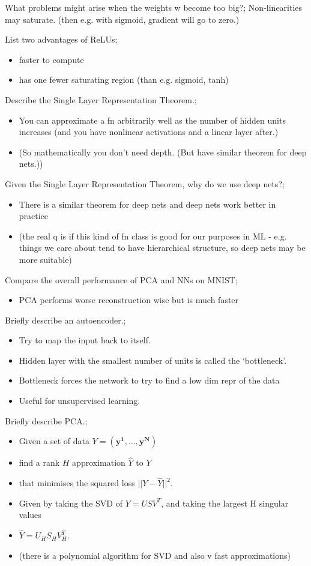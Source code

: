 \documentclass{article}
\begin{document}
What problems might arise when the weights w become too big?; Non-linearities may saturate. (then e.g. with sigmoid, gradient will go to zero.)

List two advantages of ReLUs; \begin{itemize}
    \item faster to compute
    \item has one fewer saturating region (than e.g. sigmoid, tanh)
\end{itemize}

Describe the Single Layer Representation Theorem.; \begin{itemize}
    \item You can approximate a fn arbitrarily well as the number of hidden units increases (and you have nonlinear activations and a linear layer after.)
    \item (So mathematically you don't need depth. (But have similar theorem for deep nets.))
\end{itemize}

Given the Single Layer Representation Theorem, why do we use deep nets?; \begin{itemize}
    \item There is a similar theorem for deep nets and deep nets work better in practice
    \item (the real q is if this kind of fn class is good for our purposes in ML - e.g. things we care about tend to have hierarchical structure, so deep nets may be more suitable)
\end{itemize}

Compare the overall performance of PCA and NNs on MNIST; \begin{itemize}
    \item PCA performs worse reconstruction wise but is much faster
\end{itemize}

Briefly describe an autoencoder.; \begin{itemize}
    \item Try to map the input back to itself.
    \item Hidden layer with the smallest number of units is called the `bottleneck'.
    \item Bottleneck forces the network to try to find a low dim repr of the data
    \item Useful for unsupervised learning.
\end{itemize}

Briefly describe PCA.; \begin{itemize}
    \item Given a set of data $Y = (\bm{y^1,...,y^N})$ 
    \item find a rank $H$ approximation $\hat{Y}$ to $Y$ 
    \item that minimises the squared loss $||Y - \hat{Y}||^2$.
    \item Given by taking the SVD of $Y=USV^T$, and taking the largest H singular values
    \item $\hat{Y} = U_HS_HV_H^T$.
    \item (there is a polynomial algorithm for SVD and also v fast approximations)
\end{itemize}
\end{document}
